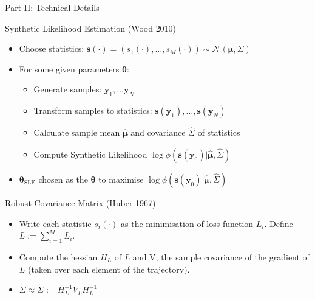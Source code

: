 \documentclass{beamer}
\begin{document}
\begin{frame}{Part II: Technical Details}

\begin{block}{Synthetic Likelihood Estimation (Wood 2010)}
    \begin{itemize}
        \item Choose statistics: $\pmb{s}(\cdot) = (s_1(\cdot), \ldots, s_M(\cdot)) \sim \mathcal{N}(\pmb{\mu}, \Sigma)$
        \item For some given parameters $\pmb{\theta}$:
        \begin{itemize}
            \item Generate samples: $\pmb{y}_1, \dots \pmb{y}_N$
            \item Transform samples to statistics: $\pmb{s}(\pmb{y}_1), \ldots, \pmb{s}(\pmb{y}_N)$
            \item Calculate sample mean $\hat{\pmb{\mu}}$ and covariance $\hat{\Sigma}$ of statistics
            \item Compute Synthetic Likelihood $\log{\phi(\pmb{s}(\pmb{y}_0) | \hat{\pmb{\mu}}, \hat{\Sigma})}$
        \end{itemize}
        \item $\pmb{\theta}_{\text{SLE}}$ chosen as the $\pmb{\theta}$ to maximise $\log{\phi(\pmb{s}(\pmb{y}_0) | \hat{\pmb{\mu}}, \hat{\Sigma})}$
    \end{itemize}
\end{block}

\begin{block}{Robust Covariance Matrix (Huber 1967)}
    \begin{itemize}
        \item Write each statistic $s_i(\cdot)$ as the minimisation of loss function $L_i$. Define $L := \sum_{i=1}^M L_i$.
        \item Compute the hessian $H_L$ of $L$ and V, the sample covariance of the gradient of $L$ (taken over each element of the trajectory).
        \item $\Sigma \approx \tilde{\Sigma} := H_L^{-1} V_{L} H_{L}^{-1}$
    \end{itemize}
\end{block}
\end{frame}
\end{document}
